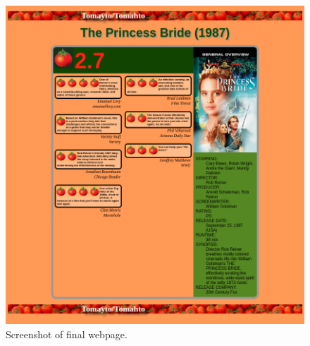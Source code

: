\documentclass{article}
\begin{document}
\begin{figure}
  \includegraphics[width=\textwidth]{images/screenshot.png}
  \caption{Screenshot of final webpage.}
\label{screenshot}
\end{figure}
\end{document}
